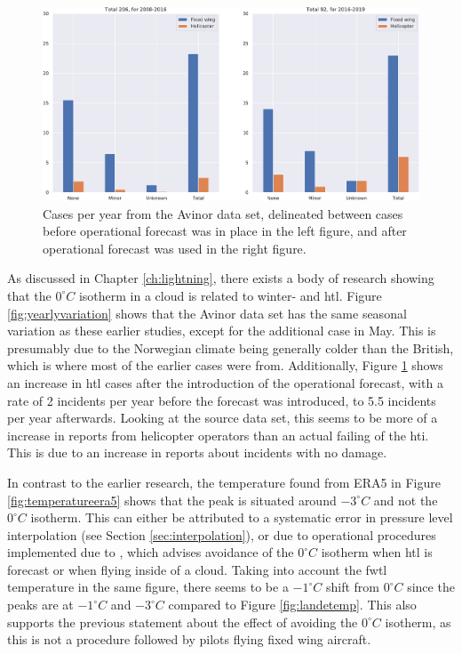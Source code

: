 \begin{figure}
    \centering
    \includegraphics[width=\textwidth]{Figures/Casesperyear.pdf}
    \caption{Cases per year from the Avinor data set, delineated between cases before operational forecast was in place in the left figure, and after operational forecast was used in the right figure.}
    \label{fig:casesperyear}
\end{figure}

As discussed in Chapter \ref{ch:lightning}, there exists a body of research showing that the $0^{\circ}C$ isotherm in a cloud is related to winter- and \acrlong{htl}. Figure \ref{fig:yearlyvariation} shows that the Avinor data set has the same seasonal variation as these earlier studies, except for the additional case in May. This is presumably due to the Norwegian climate being generally colder than the British, which is where most of the earlier cases were from. Additionally, Figure \ref{fig:casesperyear} shows an increase in \acrshort{htl} cases after the introduction of the operational forecast, with a rate of 2 incidents per year before the forecast was introduced, to 5.5 incidents per year afterwards. Looking at the source data set, this seems to be more of a increase in reports from helicopter operators than an actual failing of the \acrshort{hti}. This is due to an increase in reports about incidents with no damage.

In contrast to the earlier research, the temperature found from ERA5 in Figure \ref{fig:temperatureera5} shows that the peak is situated around $-3^{\circ}C$ and not the $0^{\circ}C$ isotherm. This can either be attributed to a systematic error in pressure level interpolation (see Section \ref{sec:interpolation}), or due to operational procedures implemented due to \cite{lande1999}, which advises avoidance of the $0^{\circ}C$ isotherm when \acrshort{htl} is forecast or when flying inside of a cloud. Taking into account the \acrshort{fwtl} temperature in the same figure, there seems to be a $-1^{\circ}C$ shift from $0^{\circ}C$ since the peaks are at $-1^{\circ}C$ and $-3^{\circ}C$ compared to Figure \ref{fig:landetemp}. This also supports the previous statement about the effect of avoiding the $0^{\circ}C$ isotherm, as this is not a procedure followed by pilots flying fixed wing aircraft.

